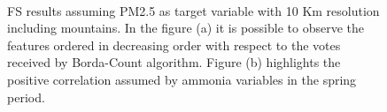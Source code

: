\begin{figure}[H]
\centering
{}\\
\caption{FS results assuming PM2.5 as target variable with 10 Km resolution including mountains. In the figure (a) it is possible to observe the features ordered in decreasing order with respect to the votes received by Borda-Count algorithm. Figure (b) highlights the positive correlation assumed by ammonia variables in the spring period. }
\label{fig:fs_pm25}
\end{figure}
